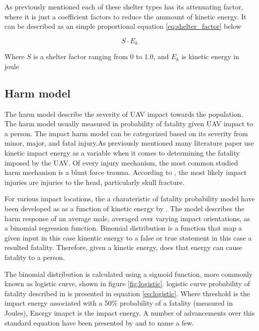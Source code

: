 \documentclass[12pt]{report}
\begin{document}
            As previously mentioned each of these shelter types has its attenuating factor, where it is just a
            coefficient factors to reduce the ammount of kinetic energy. It can be described as an simple proportional
            equation \ref{eq:shelter_factor} below

            \begin{equation}\label{eq:shelter_factor}
                S \cdot E_k
            \end{equation}

            Where \(S\) is a shelter factor ranging from 0 to 1.0, and \(E_k\) is kinetic energy in joule
            
        \subsection{Harm model}
            The harm model describe the severity of UAV impact towards the population. The harm model usually measured
            in probability of fatality given UAV impact to a person. The impact harm model can be categorized based on
            its severity from minor, major, and fatal injury.As previously mentioned many literature paper use kinetic
            impact energy as a variable when it comes to determining the fatality imposed by the UAV.  Of every injury
            mechanism, the most common studied harm mechanism is a blunt force trauma. According to
            \cite{shelley_model_2016}, the most likely impact injuries are injuries to the head, particularly skull
            fracture. 

            For various impact locations, the a charateristic of fatality probability model have been developed as as a
            function of kinetic energy by \cite{harwick_approved_2007}. The model describes the harm response of an
            average male, averaged over varying impact orientations, as a binomial regression function. Binomial
            distribution is a function that map a given input in this case kinentic energy to a false or true statement
            in this case a resulted fatality. Therefore, given a kinetic energy, does that energy can cause fatality to
            a person. 
            
            The binomial distribution is calculated using a sigmoid function, more commonly known as logistic curve,
            shown in figure \ref{fig:logistic}. logistic curve probability of fatality described in
            \cite{shelley_model_2016} is presented in equation \ref{eq:logistic}. Where threshold is the impact energy
            associated with a 50\% probability of a fatality (measured in Joules), Energy imapct is the impact energy. A
            number of advancements over this standard equation have been presented by
            \cite{dalamagkidis_evaluating_2008} and \cite{shelley_model_2016} to name a few.
\end{document}
